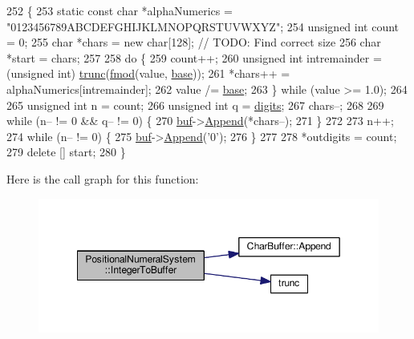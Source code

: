 \begin{DoxyCode}
252 \{
253     \textcolor{keyword}{static} \textcolor{keyword}{const} \textcolor{keywordtype}{char} *alphaNumerics = \textcolor{stringliteral}{"0123456789ABCDEFGHIJKLMNOPQRSTUVWXYZ"};
254     \textcolor{keywordtype}{unsigned} \textcolor{keywordtype}{int} count = 0;
255     \textcolor{keywordtype}{char} *chars = \textcolor{keyword}{new} \textcolor{keywordtype}{char}[128]; \textcolor{comment}{// TODO: Find correct size}
256     \textcolor{keywordtype}{char} *start = chars;
257 
258     \textcolor{keywordflow}{do} \{
259         count++;
260         \textcolor{keywordtype}{unsigned} \textcolor{keywordtype}{int} intremainder = (\textcolor{keywordtype}{unsigned} int) \hyperlink{math_8h_a82a151adfde56b28fa8a50355c4f2ff6}{trunc}(\hyperlink{math_8h_a537296d1a8f9fb621676038b99ba7edf}{fmod}(value, 
      \hyperlink{classPositionalNumeralSystem_a50cd19222978e16cc9c8b481c72c4662}{base}));
261         *chars++ = alphaNumerics[intremainder];
262         value /= \hyperlink{classPositionalNumeralSystem_a50cd19222978e16cc9c8b481c72c4662}{base};
263     \} \textcolor{keywordflow}{while} (value >= 1.0);
264 
265     \textcolor{keywordtype}{unsigned} \textcolor{keywordtype}{int} n = count;
266     \textcolor{keywordtype}{unsigned} \textcolor{keywordtype}{int} q = \hyperlink{classPositionalNumeralSystem_a0a9e8e3f5d46e3c12dd3fc994ed2c1e6}{digits};
267     chars--;
268 
269     \textcolor{keywordflow}{while} (n-- != 0 && q-- != 0) \{
270         \hyperlink{classNumeralSystem_a03e7be944bf3fa5e4c34d80f135cd017}{buf}->\hyperlink{classCharBuffer_a045b38735f7b3007c1b98d3d7b7feafe}{Append}(*chars--);
271     \}
272 
273     n++;
274     \textcolor{keywordflow}{while} (n-- != 0) \{
275         \hyperlink{classNumeralSystem_a03e7be944bf3fa5e4c34d80f135cd017}{buf}->\hyperlink{classCharBuffer_a045b38735f7b3007c1b98d3d7b7feafe}{Append}(\textcolor{charliteral}{'0'});
276     \}
277 
278     *outdigits = count;
279     \textcolor{keyword}{delete} [] start;
280 \}
\end{DoxyCode}


Here is the call graph for this function\+:\nopagebreak
\begin{figure}[H]
\begin{center}
\leavevmode
\includegraphics[width=349pt]{classPositionalNumeralSystem_ac2edd0c7d5b47dc04908038f3eb03556_cgraph}
\end{center}
\end{figure}




